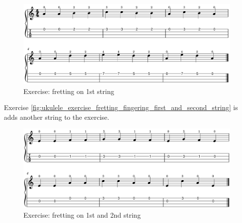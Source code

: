 \begin{figure}[h]
    \centering
    \includegraphics[width=\textwidth]{../../MuseScore/Ukulele/UkuleleExerciseFirstStringFretting.png}
    \caption{Exercise: fretting on 1st string}
    \label{fig:ukulele_exercise_fretting_fingering_first_string}
\end{figure}

Exercise \autoref{fig:ukulele_exercise_fretting_fingering_first_and_second_string} is adds another string to the exercise.

\begin{figure}[h]
	\centering
	\includegraphics[width=\textwidth]{../../MuseScore/Ukulele/UkuleleExerciseTwoStringFretting.png}
	\caption{Exercise: fretting on 1st and 2nd string}
	\label{fig:ukulele_exercise_fretting_fingering_first_and_second_string}
\end{figure}